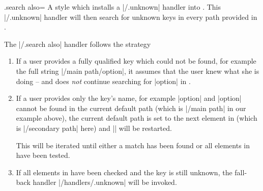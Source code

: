\begin{handler}{{.search also}=}
    A style which installs a |/.unknown| handler into . This
    |/.unknown| handler will then search for unknown keys in every path
    provided in .
\begin{codeexample}[]


\end{codeexample}

    The |/.search also| handler follows the strategy
    \begin{enumerate}
        \item If a user provides a fully qualified key which could not be
            found, for example the full string |/main path/option|, it assumes
            that the user knew what she is doing -- and does \emph{not}
            continue searching for |option| in .
        \item If a user provides only the key's name, for example |option| and
            |option| cannot be found in the current default path (which is
            |/main path| in our example above), the current default path is set
            to the next element in  (which is |/secondary path|
            here) and |\pgfkeys| will be restarted.

            This will be iterated until either a match has been found or all
            elements in  have been tested.
        \item If all
            elements in  have been checked and the key is still
            unknown, the fall-back handler |/handlers/.unknown| will be
            invoked.
    \end{enumerate}
\begin{codeexample}[]




\end{codeexample}
\end{handler}
